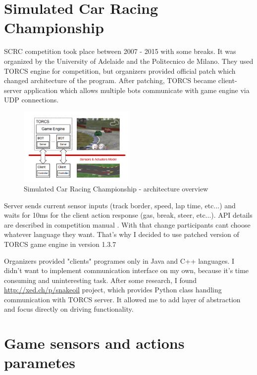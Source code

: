 \documentclass[declaration,shortabstract,english,inz]{iithesis}
\begin{document}
\section{Simulated Car Racing Championship}

SCRC competition took place between 2007 - 2015 with some breaks. It was organized by the University of Adelaide and the Politecnico de Milano.
They used TORCS engine for competition, but organizers provided official patch which changed architecture of the program.
After patching, TORCS became client-server application which allows multiple bots communicate with game engine via UDP connections. 

\begin{figure}
    \includegraphics[width=0.5\textwidth]{img/scr_architecture.png}
    \caption{Simulated Car Racing Championship - architecture overview \cite{scrc_manual}}
    \label{fig:scrc_arc}
\end{figure}

Server sends current sensor inputs (track border, speed, lap time, etc...) and waits for 10ms for the client action response (gas, break, steer, etc...).
 API details are described in competition manual \cite{scrc_manual}.
 With that change participants cant choose whatever language they want.
 That's why I decided to use patched version of TORCS game engine in version 1.3.7

Organizers provided "clients" programes only in Java and C++ languages.
I didn't want to implement communication interface on my own, because it's time consuming  and uninteresting task.
After some research, I found \url{http://xed.ch/p/snakeoil} project, which provides Python class handling communication with TORCS server.
It allowed me to add layer of abstraction and focus directly on driving functionality.

\section{Game sensors and actions parametes}
    
\end{document}
